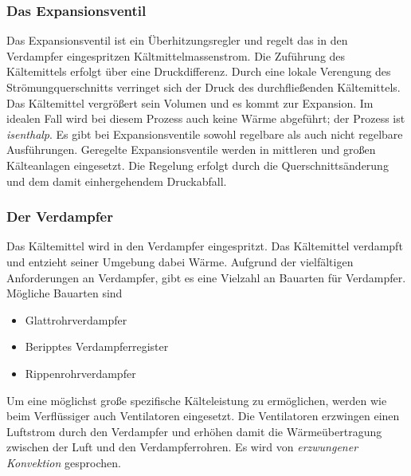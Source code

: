 \subsubsection*{Das Expansionsventil}

Das Expansionsventil ist ein Überhitzungsregler und regelt das in den Verdampfer eingespritzen Kältmittelmassenstrom. Die Zuführung des Kältemittels erfolgt über eine Druckdifferenz. Durch eine lokale Verengung des Strömungquerschnitts verringet sich der Druck des durchfließenden Kältemittels. Das Kältemittel vergrößert sein Volumen und es kommt zur Expansion. Im idealen Fall wird bei diesem Prozess auch keine Wärme abgeführt; der Prozess ist \textit{isenthalp}. 
 Es gibt bei Expansionsventile sowohl  regelbare als auch nicht regelbare Ausführungen.  Geregelte Expansionsventile werden in mittleren und großen Kälteanlagen eingesetzt. Die Regelung erfolgt durch die Querschnittsänderung und dem damit einhergehendem Druckabfall.  

\subsubsection*{Der Verdampfer}

Das Kältemittel wird in den Verdampfer eingespritzt. Das Kältemittel verdampft und entzieht seiner Umgebung dabei Wärme. Aufgrund der vielfältigen Anforderungen an Verdampfer, gibt es eine Vielzahl an Bauarten für Verdampfer. Mögliche Bauarten sind 

\begin{itemize}
\item Glattrohrverdampfer
\item Beripptes Verdampferregister
\item Rippenrohrverdampfer
\end{itemize}

Um eine möglichst große spezifische Kälteleistung zu ermöglichen, werden wie beim Verflüssiger auch Ventilatoren eingesetzt. Die Ventilatoren erzwingen einen Luftstrom durch den Verdampfer und erhöhen damit die Wärmeübertragung zwischen der Luft und den Verdampferrohren. Es wird von \textit{erzwungener Konvektion} gesprochen. 

